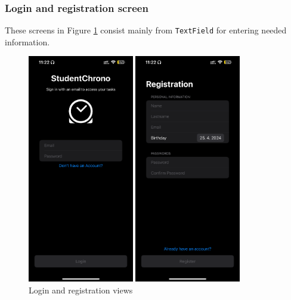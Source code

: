 \documentclass[
  biblatex = false,
  language=english,
  figures=false,
  sourcecodes,
  glossaries,
  index
]{kidiplom}
\begin{document}
\subsubsection{Login and registration screen}
These screens in Figure \ref{fig:image6-7} consist mainly from \texttt{TextField} for entering needed information.
\begin{figure}[h!]
\centering
\begin{minipage}[b]{0.4\textwidth}
	\includegraphics[height=10cm]{image6}
\end{minipage}
\begin{minipage}[b]{0.4\textwidth}
	\includegraphics[height=10cm]{image7}
\end{minipage}
\caption{Login and registration views}
\label{fig:image6-7}
\end{figure}
\end{document}
